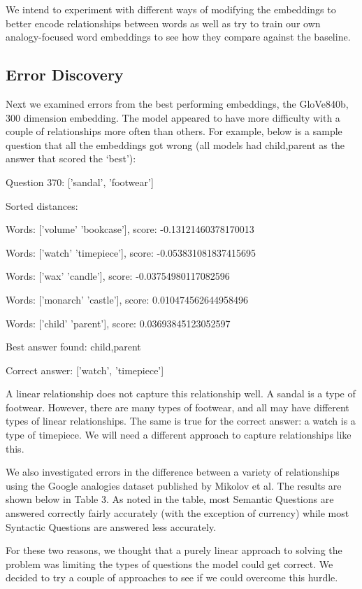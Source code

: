 \documentclass[11pt]{article}
\begin{document}
We intend to experiment with different ways of modifying the embeddings
to better encode relationships between words as well as try to train our
own analogy-focused word embeddings to see how they compare against the
baseline.

\subsection{Error Discovery}

Next we examined errors from the best performing embeddings, the
GloVe840b, 300 dimension embedding. The model appeared to have more
difficulty with a couple of relationships more often than others. For
example, below is a sample question that all the embeddings got wrong
(all models had child,parent as the answer that scored the `best'):

Question 370: {[}'sandal', 'footwear'{]}

Sorted distances:

Words: {[}'volume' 'bookcase'{]}, score: -0.13121460378170013

Words: {[}'watch' 'timepiece'{]}, score: -0.053831081837415695

Words: {[}'wax' 'candle'{]}, score: -0.03754980117082596

Words: {[}'monarch' 'castle'{]}, score: 0.010474562644958496

Words: {[}'child' 'parent'{]}, score: 0.03693845123052597

Best answer found: child,parent

Correct answer: {[}'watch', 'timepiece'{]}

A linear relationship does not capture this relationship well. A sandal
is a type of footwear. However, there are many types of footwear, and
all may have different types of linear relationships. The same is true
for the correct answer: a watch is a type of timepiece. We will need a
different approach to capture relationships like this.

We also investigated errors in the difference between a variety of
relationships using the Google analogies dataset published by Mikolov et
al. The results are shown below in Table 3. As noted in the table, most
Semantic Questions are answered correctly fairly accurately (with the
exception of currency) while most Syntactic Questions are answered less
accurately.

For these two reasons, we thought that a purely linear approach to
solving the problem was limiting the types of questions the model could
get correct. We decided to try a couple of approaches to see if we could
overcome this hurdle.
\end{document}
